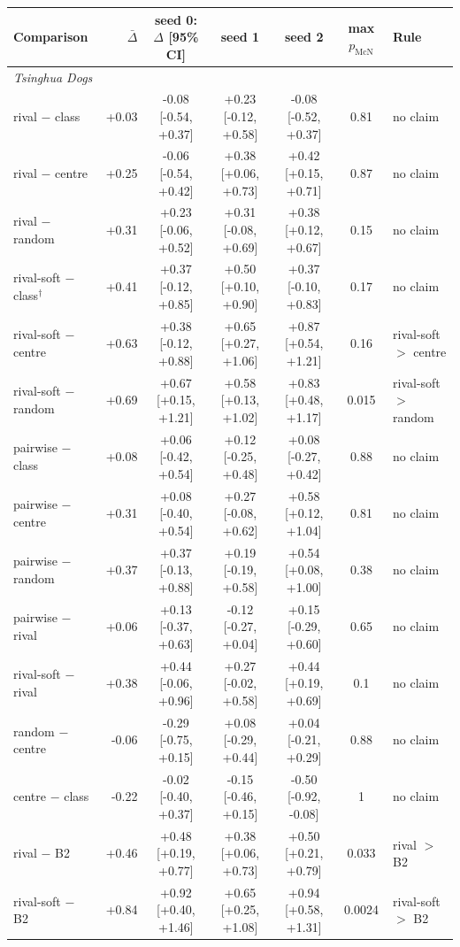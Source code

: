 \begin{tabular}{lrccccl}
\toprule
Comparison & $\bar\Delta$ & seed 0: $\Delta$ [95\% CI] & seed 1 & seed 2 & max $p_{\mathrm{McN}}$ & Rule \\
\midrule
\multicolumn{7}{l}{\emph{Tsinghua Dogs}} \\
rival $-$ class & +0.03 & -0.08 [-0.54, +0.37] & +0.23 [-0.12, +0.58] & -0.08 [-0.52, +0.37] & 0.81 & no claim \\
rival $-$ centre & +0.25 & -0.06 [-0.54, +0.42] & +0.38 [+0.06, +0.73] & +0.42 [+0.15, +0.71] & 0.87 & no claim \\
rival $-$ random & +0.31 & +0.23 [-0.06, +0.52] & +0.31 [-0.08, +0.69] & +0.38 [+0.12, +0.67] & 0.15 & no claim \\
rival-soft $-$ class$^\dagger$ & +0.41 & +0.37 [-0.12, +0.85] & +0.50 [+0.10, +0.90] & +0.37 [-0.10, +0.83] & 0.17 & no claim \\
rival-soft $-$ centre & +0.63 & +0.38 [-0.12, +0.88] & +0.65 [+0.27, +1.06] & +0.87 [+0.54, +1.21] & 0.16 & rival-soft $>$ centre \\
rival-soft $-$ random & +0.69 & +0.67 [+0.15, +1.21] & +0.58 [+0.13, +1.02] & +0.83 [+0.48, +1.17] & 0.015 & rival-soft $>$ random \\
pairwise $-$ class & +0.08 & +0.06 [-0.42, +0.54] & +0.12 [-0.25, +0.48] & +0.08 [-0.27, +0.42] & 0.88 & no claim \\
pairwise $-$ centre & +0.31 & +0.08 [-0.40, +0.54] & +0.27 [-0.08, +0.62] & +0.58 [+0.12, +1.04] & 0.81 & no claim \\
pairwise $-$ random & +0.37 & +0.37 [-0.13, +0.88] & +0.19 [-0.19, +0.58] & +0.54 [+0.08, +1.00] & 0.38 & no claim \\
pairwise $-$ rival & +0.06 & +0.13 [-0.37, +0.63] & -0.12 [-0.27, +0.04] & +0.15 [-0.29, +0.60] & 0.65 & no claim \\
rival-soft $-$ rival & +0.38 & +0.44 [-0.06, +0.96] & +0.27 [-0.02, +0.58] & +0.44 [+0.19, +0.69] & 0.1 & no claim \\
random $-$ centre & -0.06 & -0.29 [-0.75, +0.15] & +0.08 [-0.29, +0.44] & +0.04 [-0.21, +0.29] & 0.88 & no claim \\
centre $-$ class & -0.22 & -0.02 [-0.40, +0.37] & -0.15 [-0.46, +0.15] & -0.50 [-0.92, -0.08] & 1 & no claim \\
rival $-$ B2 & +0.46 & +0.48 [+0.19, +0.77] & +0.38 [+0.06, +0.73] & +0.50 [+0.21, +0.79] & 0.033 & rival $>$ B2 \\
rival-soft $-$ B2 & +0.84 & +0.92 [+0.40, +1.46] & +0.65 [+0.25, +1.08] & +0.94 [+0.58, +1.31] & 0.0024 & rival-soft $>$ B2 \\

\end{tabular}
